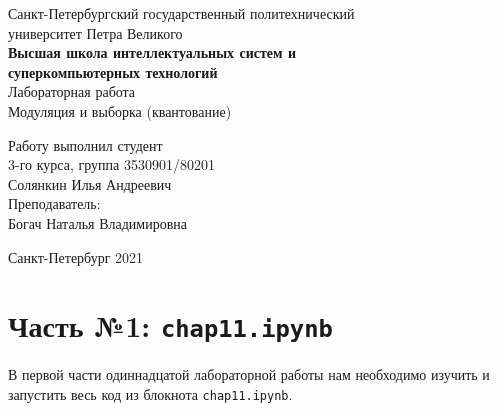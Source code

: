 \documentclass[a4paper]{article}
\begin{document}
    \begin{center}
        \begin{center}
        \hfill \break
        \normalsize{Санкт-Петербургский государственный политехнический}\\
        \normalsize{университет Петра Великого}\\
        \hfill \break
        \normalsize{\textbf{Высшая школа интеллектуальных систем и}}\\ 
        \normalsize{\textbf{суперкомпьютерных технологий}}\\ 
        \hfill \break
        \hfill \break
        \hfill \break
        \normalsize{Лабораторная работа}\\
        \hfill \break
        \hfill \break
        \normalsize{\LARGE Модуляция и выборка (квантование)}\\
        \end{center}
        \hfill \break
        \hfill \break
        \hfill \break
        \hfill \break
        \hfill \break
        \hfill \break
        \hfill \break
        \hfill \break
        \hfill \break
        \hfill \break
        \begin{flushright}
            \normalsize{Работу выполнил студент}\\
            \normalsize{3-го курса, группа 3530901/80201}\\
            \normalsize{Солянкин Илья Андреевич}\\
            \hfill \break
            \normalsize{Преподаватель:}\\
            \normalsize{Богач Наталья Владимировна}\\
        \end{flushright}
        \hfill \break
        \hfill \break
        \hfill \break
        \hfill \break
        \begin{center} Санкт-Петербург 2021 \end{center}
        \thispagestyle{empty}
    \end{center}
    
    \newpage
        \tableofcontents
    
    \newpage
         \listoffigures
    
    \newpage
         \lstlistoflistings   
     
    \newpage
        \section{Часть №1: \texttt{chap11.ipynb}}
            В первой части одиннадцатой лабораторной работы нам необходимо изучить и запустить весь код из блокнота \texttt{chap11.ipynb}.
            
\end{document}
